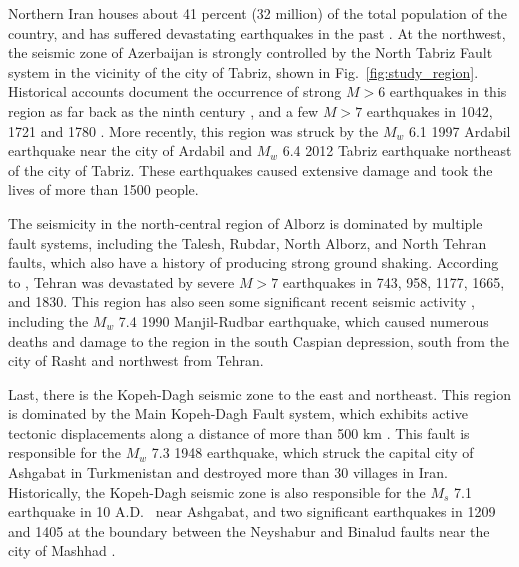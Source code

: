 Northern Iran houses about 41 percent (32 million) of the total population of the country, and has suffered devastating earthquakes in the past \citep[e.g.,][]{Mehrain_1990_Tech, Chafory-Ashtiany_1999_DPM, Razzaghi_2012_Tech}. At the northwest, the seismic zone of Azerbaijan is strongly controlled by the North Tabriz Fault system in the vicinity of the city of Tabriz, shown in Fig.~\ref{fig:study_region}. Historical accounts document the occurrence of strong $M>6$ earthquakes in this region as far back as the ninth century \citep{Berberian1999}, and a few $M>7$ earthquakes in 1042, 1721 and 1780 \citep{Jones1834}. More recently, this region was struck by the $M_w$ 6.1 1997 Ardabil earthquake near the city of Ardabil and $M_w$ 6.4 2012 Tabriz earthquake northeast of the city of Tabriz. These earthquakes caused extensive damage and took the lives of more than 1500 people. 

The seismicity in the north-central region of Alborz is dominated by multiple fault systems, including the Talesh, Rubdar, North Alborz, and North Tehran faults, which also have a history of producing strong ground shaking. According to \citet{Ambraseys_1982_Book}, Tehran was devastated by severe $M>7$ earthquakes in 743, 958, 1177, 1665, and 1830. This region has also seen some significant recent seismic activity \citep{Berberian1999}, including the $M_w$ 7.4 1990 Manjil-Rudbar earthquake, which caused numerous deaths and damage to the region in the south Caspian depression, south from the city of Rasht and northwest from Tehran. 

Last, there is the Kopeh-Dagh seismic zone to the east and northeast. This region is dominated by the Main Kopeh-Dagh Fault system, which exhibits active tectonic displacements along a distance of more than 500 km \citep{Trifonov1978}. This fault is responsible for the $M_w$ 7.3 1948 earthquake, which struck the capital city of Ashgabat in Turkmenistan and destroyed more than 30 villages in Iran. Historically, the Kopeh-Dagh seismic zone is also responsible for the $M_s$ 7.1 earthquake in 10 A.D.~\citep{Berberian2001} near Ashgabat, and two significant earthquakes in 1209 and 1405 at the boundary between the Neyshabur and Binalud faults near the city of Mashhad \citep{Berberian1999}.


